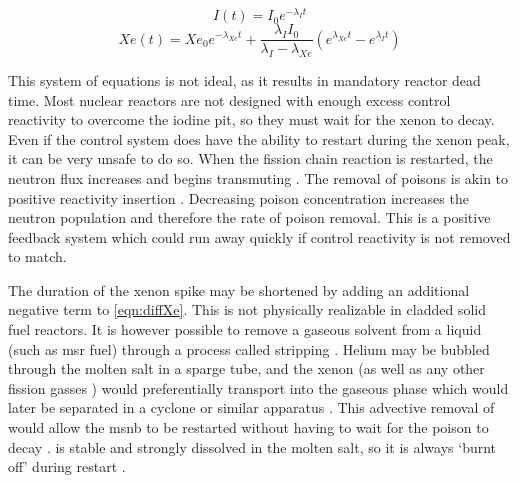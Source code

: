 \begin{equation}\label{eqn:I_inf}
    I(t) = I_0e^{-\lambda_I t}
\end{equation}
\begin{equation}\label{eqn:Xe_inf}
    Xe(t) = Xe_0e^{-\lambda_{Xe} t}+\frac{\lambda_I I_0}{\lambda_I - \lambda_{Xe}}(e^{\lambda_{Xe}t}-e^{\lambda_{I}t})
\end{equation}

This system of equations is not ideal, as it results in mandatory reactor dead time. Most nuclear reactors are not designed with enough excess control reactivity to overcome the iodine pit, so they must wait for the xenon to decay. Even if the control system does have the ability to restart during the xenon peak, it can be very unsafe to do so. When the fission chain reaction is restarted, the neutron flux increases and begins transmuting \Xe. The removal of poisons is akin to positive reactivity insertion \cite{Roberson}. Decreasing poison concentration increases the neutron population and therefore the rate of poison removal. This is a positive feedback system which could run away quickly if control reactivity is not removed to match. 

The duration of the xenon spike may be shortened by adding an additional negative term to \ref{eqn:diffXe}. This is not physically realizable in cladded solid fuel reactors. It is however possible to remove a gaseous solvent from a liquid (such as \acs{msr} fuel) through a process called stripping \cite[Ch. 10]{Geankoplis}. Helium may be bubbled through the molten salt in a sparge tube, and the xenon (as well as any other fission gasses \cite{Offgas}) would preferentially transport into the gaseous phase which would later be separated in a cyclone or similar apparatus \cite{ORNL-masstransport}. This advective removal of \Xe would allow the \acs{msnb} to be restarted without having to wait for the poison to decay \cite{RootXe}. \Sa is stable and strongly dissolved in the molten salt, so it is always `burnt off' during restart \cite[Ch. 7]{Lamarsh}.